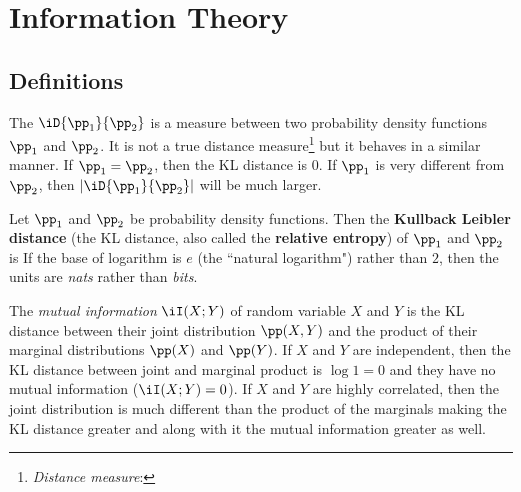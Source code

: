 \section{Information Theory}
\subsection{Definitions}
The  $\iD{\pp_1}{\pp_2}$  is a 
measure between two probability density functions $\pp_1$ and $\pp_2$.
It is not a true distance measure\footnote{
  {\em Distance measure}: 
  }
but it behaves in a similar manner.
If $\pp_1=\pp_2$, then the KL distance is 0.
If $\pp_1$ is very different from $\pp_2$, then $|\iD{\pp_1}{\pp_2}|$ 
will be much larger.

\begin{definition}
\label{def:kld}
Let $\pp_1$ and $\pp_2$ be probability density functions.
Then the {\bf Kullback Leibler distance}
(the KL distance, also called the {\bf relative entropy})
of $\pp_1$ and $\pp_2$ is
If the base of logarithm is $e$ (the ``natural logarithm") rather than $2$,
then the units are {\em nats} rather than {\em bits}.
\end{definition}

The {\em mutual information} $\iI(X;Y)$ of random variable $X$ and $Y$ is
the KL distance between their joint distribution $\pp(X,Y)$ and the 
product of their marginal distributions $\pp(X)$ and $\pp(Y)$.
If $X$ and $Y$ are independent, then the KL distance between 
joint and marginal product is $\log1=0$ and they have no 
mutual information ($\iI(X;Y)=0$).
If $X$ and $Y$ are highly correlated, then the joint distribution is
much different than the product of the marginals making the KL distance
greater and along with it the mutual information greater as well.
\begin{definition}
\label{def:I(X;Y)}
\end{definition}

